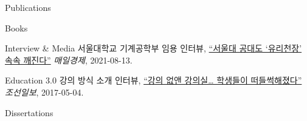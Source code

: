 \begin{rSection}{Publications}
{\begin{pubSubsectionNum}{Books}
  \end{pubSubsectionNum}

  \begin{pubSubsectionNum}{Interview \& Media}
    서울대학교 기계공학부 임용 인터뷰,
    \hyperlink{https://www.mk.co.kr/news/society/view/2021/08/787393/}{``서울대 공대도 `유리천장' 속속 깨진다''}
    \textit{매일경제}, 2021-08-13.

    Education 3.0 강의 방식 소개 인터뷰,
    \hyperlink{http://news.chosun.com/site/data/html_dir/2017/05/04/2017050400133.html}{``강의 없앤 강의실… 학생들이 떠들썩해졌다''}
    \textit{조선일보}, 2017-05-04.

  \end{pubSubsectionNum}
}

\begin{pubSubsectionNum}{Dissertations}
  \item {}
  \item {}
\end{pubSubsectionNum}


\end{rSection}
